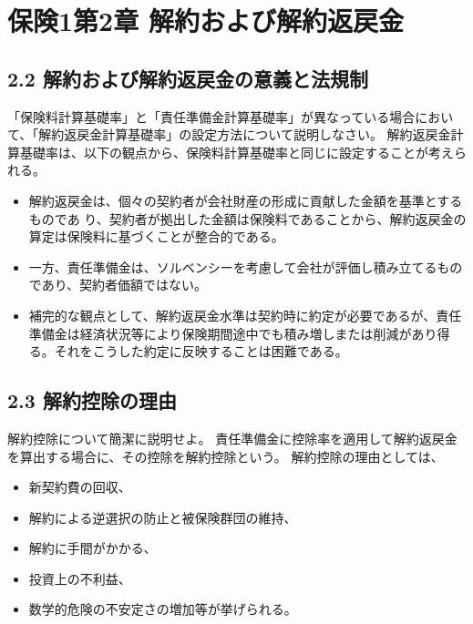 \documentclass[report,gutter=10mm,fore-edge=10mm,uplatex,dvipdfmx]{jlreq}
\begin{document}
\chapter{保険1第2章 解約および解約返戻金}
\section{2.2 解約および解約返戻金の意義と法規制}
「保険料計算基礎率」と「責任準備金計算基礎率」が異なっている場合において、「解約返戻金計算基礎率」の設定方法について説明しなさい。
解約返戻金計算基礎率は、以下の観点から、保険料計算基礎率と同じに設定することが考えられる。  
\begin{itemize}
\item 解約返戻金は、個々の契約者が会社財産の形成に貢献した金額を基準とするものであ  り、契約者が拠出した金額は保険料であることから、解約返戻金の算定は保険料に基づくことが整合的である。
\item 一方、責任準備金は、ソルベンシーを考慮して会社が評価し積み立てるものであり、契約者価額ではない。
\item 補完的な観点として、解約返戻金水準は契約時に約定が必要であるが、責任準備金は経済状況等により保険期間途中でも積み増しまたは削減があり得る。それをこうした約定に反映することは困難である。
\end{itemize}

\section{2.3 解約控除の理由}

解約控除について簡潔に説明せよ。
責任準備金に控除率を適用して解約返戻金を算出する場合に、その控除を解約控除という。
解約控除の理由としては、
\begin{itemize}
\item 新契約費の回収、
\item 解約による逆選択の防止と被保険群団の維持、
\item 解約に手間がかかる、
\item 投資上の不利益、
\item 数学的危険の不安定さの増加等が挙げられる。
\end{itemize}
\end{document}
